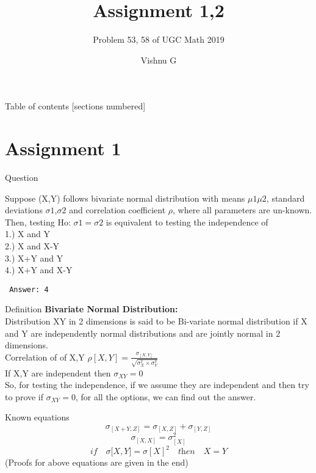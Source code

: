 \documentclass[10pt]{beamer}
\title{Assignment 1,2}
\subtitle{Problem 53, 58 of UGC Math 2019}
\date{}
\author{Vishnu G}
\institute{Indian Institute of Technology Hyderabad}
\begin{document}
\maketitle

\begin{frame}{Table of contents}
  [sections numbered]
  \tableofcontents%
\end{frame}

\section[Assignment 1]{Assignment 1}

\begin{frame}[fragile]{Question}

Suppose (X,Y) follows bivariate normal distribution with means $\mu1  \mu2$, standard deviations $\sigma1$,$\sigma2$ and correlation coefficient $\rho$, where all parameters are un-known. Then, testing Ho: $\sigma1=\sigma2$ is equivalent to testing the independence of  
\\
1.) X and Y \\
2.) X and X-Y \\
3.) X+Y and Y \\
4.) X+Y and X-Y \\

 \begin{verbatim}
 Answer: 4
 \end{verbatim}
\end{frame}
\begin{frame}[fragile]{Definition}
\large \textbf{Bivariate Normal Distribution:}\\
\small Distribution XY in 2 dimensions is said to be Bi-variate normal distribution if X and Y are independently normal distributions and are jointly normal in 2 dimensions. \\
Correlation of of X,Y $\rho[X,Y] = \frac{\sigma_{[X,Y]} } {\sqrt{\sigma_X^2 \times \sigma_Y^2}}$\\
If X,Y are independent then $\sigma_{XY}=0$\\
So, for testing the independence, if we assume they are independent and then try to prove if $\sigma_{XY}=0$, for all the options, we can find out the answer.
\end{frame}
\begin{frame}{Known equations}
\begin{equation} \label{eu_eqn_1}
  \sigma_{[X+Y,Z]} = \sigma_{[X,Z]} + \sigma_{[Y,Z]}
\end{equation}
\begin{equation} \label{eu_eqn_2}
  \sigma_{[X,X]} = \sigma_{[X]}^2
\end{equation}
\begin{equation} \label{eu_eqn_3}
  \textit{if}\quad \sigma{[X,Y}] = \sigma{[X]}^2 \quad \textit{then} \quad X=Y
\end{equation}
\small (Proofs for above equations are given in the end)
\end{frame}
\end{document}
